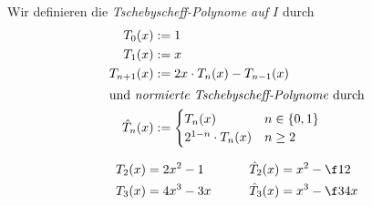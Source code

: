 \documentclass[11pt]{scrbook}
\begin{document}
\begin{df} \label{1.13}
	Wir definieren die \emph{Tschebyscheff-Polynome auf $I$} durch
	\begin{align*}
		T_0(x) &:= 1\\
		T_1(x) &:= x\\
		T_{n+1}(x) &:= 2x\cdot T_n(x) - T_{n-1}(x)\\
	\intertext{und \emph{normierte Tschebyscheff-Polynome} durch}
		\hat T_n(x) &:= \begin{cases} T_n(x) & n \in \{0,1\} \\
			2^{1-n} \cdot T_n(x) & n \ge 2
		\end{cases}
	\end{align*}
\end{df}

\begin{ex*}
	\begin{alignat*}{2}
		T_2(x) &= 2x^2 - 1\qquad&  \hat T_2(x) &= x^2 -\f 12\\
		T_3(x) &= 4x^3 - 3x \qquad& 		\hat T_3(x) &= x^3 -  \f 34 x
	\end{alignat*}
\end{ex*}
\end{document}
